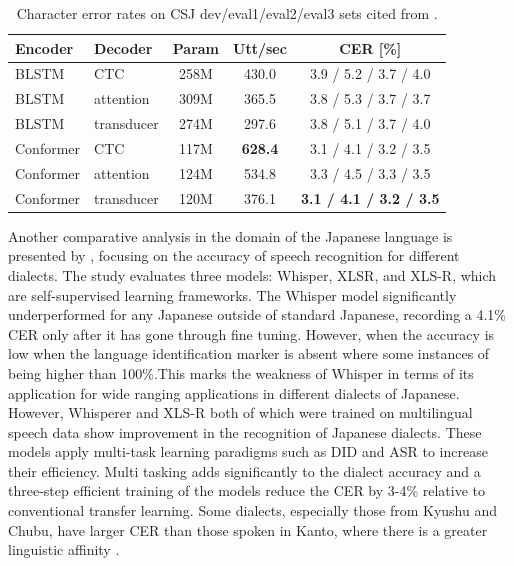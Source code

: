 \begin{table}[h!]
    \centering
    \caption{Character error rates on CSJ dev/eval1/eval2/eval3 sets cited from \cite{Karita2021}.}
    \begin{tabular}{l|l|c|c|c}
    \hline
    \textbf{Encoder}   & \textbf{Decoder}   & \textbf{Param} & \textbf{Utt/sec} & \textbf{CER [\%]} \\ \hline
    BLSTM              & CTC               & 258M             & 430.0            & 3.9 / 5.2 / 3.7 / 4.0 \\ 
    BLSTM              & attention         & 309M             & 365.5            & 3.8 / 5.3 / 3.7 / 3.7 \\ 
    BLSTM              & transducer        & 274M             & 297.6            & 3.8 / 5.1 / 3.7 / 4.0 \\ 
    Conformer          & CTC               & 117M             & \textbf{628.4}   & 3.1 / 4.1 / 3.2 / 3.5 \\ 
    Conformer          & attention         & 124M             & 534.8            & 3.3 / 4.5 / 3.3 / 3.5 \\ 
    Conformer          & transducer        & 120M             & 376.1            & \textbf{3.1 / 4.1 / 3.2 / 3.5} \\ \hline
    \end{tabular}
    \label{tab:cer_comparison}
    \end{table}

Another comparative analysis in the domain of the Japanese language is presented by \textcite{takahashi2024comparison}, focusing on the accuracy of speech recognition for different dialects. The study evaluates three models: Whisper, XLSR, and XLS-R, which are self-supervised learning frameworks. The Whisper model significantly underperformed for any Japanese outside of standard Japanese, recording a 4.1\% CER only after it has gone through fine tuning. However, when the accuracy is low when the language identification marker is absent where some instances of being higher than 100\%.This marks the weakness of Whisper in terms of its application for wide ranging applications in different dialects of Japanese. However, Whisperer and XLS-R both of which were trained on multilingual speech data show improvement in the recognition of Japanese dialects. These models apply multi-task learning paradigms such as DID and ASR to increase their efficiency. Multi tasking adds significantly to the dialect accuracy and a three-step efficient training of the models reduce the CER by 3-4\% relative to conventional transfer learning. Some dialects, especially those from Kyushu and Chubu, have larger CER than those spoken in Kanto, where there is a greater linguistic affinity \parencite{takahashi2024comparison}.

